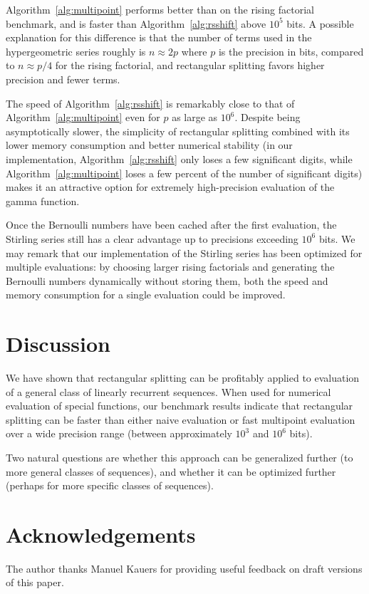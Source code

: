 \documentclass{sig-alternate}
\begin{document}
Algorithm~\ref{alg:multipoint} performs better than on
the rising factorial benchmark, and is
faster than Algorithm~\ref{alg:rsshift} above $10^5$ bits.
A possible explanation for this difference is that
the number of terms used in the hypergeometric series roughly is $n \approx 2p$
where $p$ is the precision in bits, compared to $n \approx p / 4$
for the rising factorial, and rectangular splitting
favors higher precision and fewer terms.

The speed of Algorithm~\ref{alg:rsshift} is remarkably close to
that of Algorithm~\ref{alg:multipoint} even for $p$
as large as $10^6$.
Despite being asymptotically slower, the
simplicity of rectangular splitting
combined with its lower memory consumption and better
numerical stability (in our implementation, Algorithm~\ref{alg:rsshift}
only loses a few significant digits,
while Algorithm~\ref{alg:multipoint} loses a few percent of the number of significant digits)
makes it an attractive option for extremely high-precision
evaluation of the gamma function.

Once the Bernoulli numbers have been cached after the first evaluation, the Stirling series
still has a clear advantage up to precisions exceeding $10^6$ bits.
We may remark that our implementation of the Stirling series
has been optimized for multiple evaluations: by choosing
larger rising factorials and generating the Bernoulli numbers dynamically
without storing them, both the speed and memory consumption
for a single evaluation could be improved.

\section{Discussion}

We have shown that rectangular splitting can be profitably
applied to evaluation of a general class of linearly recurrent sequences.
When used for numerical evaluation of special functions, our benchmark results
indicate that rectangular splitting can be faster than either naive evaluation
or fast multipoint evaluation over a wide precision range
(between approximately $10^3$ and $10^6$ bits).

Two natural questions are whether this approach can be generalized
further (to more general classes of sequences), and whether
it can be optimized further (perhaps for more specific classes
of sequences).

\section{Acknowledgements}

The author thanks Manuel Kauers for providing
useful feedback on draft versions of this paper.



\end{document}
